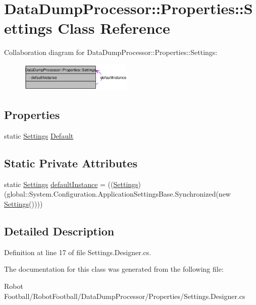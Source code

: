 \hypertarget{class_data_dump_processor_1_1_properties_1_1_settings}{
\section{Data\-Dump\-Processor::Properties::Settings Class Reference}
\label{class_data_dump_processor_1_1_properties_1_1_settings}
}
Collaboration diagram for Data\-Dump\-Processor::Properties::Settings:\begin{figure}[H]
\begin{center}
\leavevmode
\includegraphics[width=152pt]{class_data_dump_processor_1_1_properties_1_1_settings__coll__graph}
\end{center}
\end{figure}
\subsection*{Properties}
\begin{CompactItemize}
\item 
\hypertarget{class_data_dump_processor_1_1_properties_1_1_settings_729e2b751bdf46f409745f21f528f7bb}{
static \hyperlink{class_data_dump_processor_1_1_properties_1_1_settings}{Settings} \hyperlink{class_data_dump_processor_1_1_properties_1_1_settings_729e2b751bdf46f409745f21f528f7bb}{Default}}
\label{class_data_dump_processor_1_1_properties_1_1_settings_729e2b751bdf46f409745f21f528f7bb}

\end{CompactItemize}
\subsection*{Static Private Attributes}
\begin{CompactItemize}
\item 
\hypertarget{class_data_dump_processor_1_1_properties_1_1_settings_4375de0ac7895659ccf9db2a330deda6}{
static \hyperlink{class_data_dump_processor_1_1_properties_1_1_settings}{Settings} \hyperlink{class_data_dump_processor_1_1_properties_1_1_settings_4375de0ac7895659ccf9db2a330deda6}{default\-Instance} = ((\hyperlink{class_data_dump_processor_1_1_properties_1_1_settings}{Settings})(global::System.Configuration.Application\-Settings\-Base.Synchronized(new \hyperlink{class_data_dump_processor_1_1_properties_1_1_settings}{Settings}())))}
\label{class_data_dump_processor_1_1_properties_1_1_settings_4375de0ac7895659ccf9db2a330deda6}

\end{CompactItemize}


\subsection{Detailed Description}




Definition at line 17 of file Settings.Designer.cs.

The documentation for this class was generated from the following file:\begin{CompactItemize}
\item 
Robot Football/Robot\-Football/Data\-Dump\-Processor/Properties/Settings.Designer.cs\end{CompactItemize}
